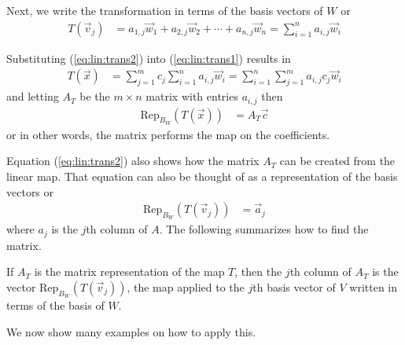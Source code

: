 Next, we write the transformation in terms of the basis vectors of $W$ or 
%
\begin{align} \label{eq:lin:trans2}
T(\vec{v}_j) & = a_{1,j} \vec{w}_1 + a_{2,j} \vec{w}_2 + \cdots + a_{n,j} \vec{w}_n  = \sum_{i=1}^n a_{i,j} \vec{w}_i 
\end{align}

Substituting (\ref{eq:lin:trans2}) into (\ref{eq:lin:trans1}) results in 
%
\begin{align*}
T(\vec{x}) & = \sum_{j=1}^m c_j \sum_{i=1}^n a_{i,j} \vec{w}_i 
= \sum_{i=1}^n \sum_{j=1}^m  a_{i,j} c_j \vec{w}_i 
\end{align*}
and letting $A_T$ be the $m \times n$ matrix with entries $a_{i,j}$ then
%
\begin{align*}
\text{Rep}_{B_W} (T(\vec{x}))  & = A_T\vec{c}
\end{align*}
or in other words, the matrix performs the map on the coefficients.  

Equation (\ref{eq:lin:trans2}) also shows how the matrix $A_T$ can be created from the linear map.  That equation can also be thought of as a representation of the basis vectors or 
%
\begin{align*}
\text{Rep}_{B_W} ( T(\vec{v}_j)) & = \vec{a}_j
\end{align*}
where $a_j$ is the $j$th column of $A$.  The following summarizes how to find the matrix.  

\begin{Boxed*}
If $A_T$ is the matrix representation of the map $T$, then the $j$th column of $A_T$  is the vector $\text{Rep}_{B_W}(T(\vec{v}_j))$, the map applied to the $j$th basis vector of $V$ written in terms of the basis of $W$.   
\end{Boxed*}

We now show many examples on how to apply this.  

